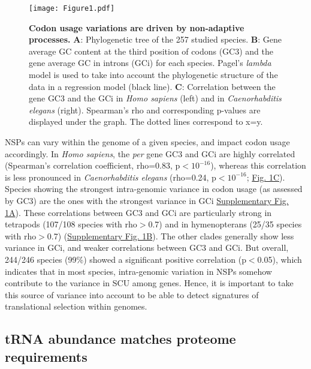 \begin{figure}[t]   
    \begin{center}
        \texttt{[image: Figure1.pdf]}
    \end{center}                                                                       
    \caption[Codon usage variations are driven by non-adaptive processes]{\textbf{Codon usage variations are driven by non-adaptive processes.} \textbf{A}: Phylogenetic tree of the 257 studied species. \textbf{B}: Gene average GC content at the third position of codons (GC3) and the gene average GC in introns (GCi) for each species. Pagel's \textit{lambda} model is used to take into account the phylogenetic structure of the data in a regression model (black line). \textbf{C}: Correlation between the gene GC3 and the GCi in \textit{Homo sapiens} (left) and in \textit{Caenorhabditis elegans} (right). Spearman's rho and corresponding p-values are displayed under the graph. The dotted lines correspond to x=y.}
    \label{fig:CU1}
\end{figure}

NSPs can vary within the genome of a given species, and impact codon usage accordingly. In \textit{Homo sapiens}, the \textit{per} gene GC3 and GCi are highly correlated (Spearman's correlation coefficient, rho=0.83, p$<$$10^{-16}$), whereas this correlation is less pronounced in \textit{Caenorhabditis elegans} (rho=0.24, p$<$$10^{-16}$; \hyperref[fig:CU1]{Fig. 1C}). Species showing the strongest intra-genomic variance in codon usage (as assessed by  GC3) are the ones with the strongest variance in GCi \hyperref[suppfig:CU1]{Supplementary Fig. 1A}). These correlations between GC3 and GCi are particularly strong in tetrapods (107/108 species with rho$>$0.7) and in hymenopterans (25/35 species with rho$>$0.7)  (\hyperref[suppfig:CU1]{Supplementary Fig. 1B}). The other clades generally show less variance in GCi, and weaker correlations between GC3 and GCi. But overall, 244/246 species (99\%) showed a significant positive correlation (p$<$0.05), which indicates that in most species, intra-genomic variation in NSPs somehow contribute to the variance in SCU among genes. Hence, it is important to take this source of variance into account to be able to detect signatures of translational selection within genomes.

\subsection{tRNA abundance matches proteome requirements}

